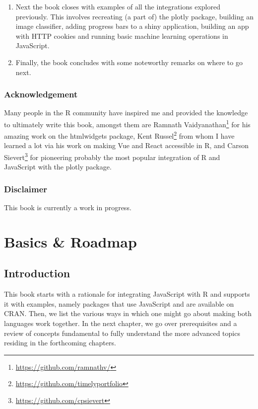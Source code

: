 \documentclass[
]{krantz}
\renewcommand{\href}[2]{#2\footnote{\url{#1}}}
\begin{document}
\begin{enumerate}
\item
  Next the book closes with examples of all the integrations explored previously. This involves recreating (a part of) the plotly package, building an image classifier, adding progress bars to a shiny application, building an app with HTTP cookies and running basic machine learning operations in JavaScript.
\item
  Finally, the book concludes with some noteworthy remarks on where to go next.
\end{enumerate}

\hypertarget{acknowledgement}{%
\section*{Acknowledgement}\label{acknowledgement}}


Many people in the R community have inspired me and provided the knowledge to ultimately write this book, amongst them are \href{https://github.com/ramnathv/}{Ramnath Vaidyanathan} for his amazing work on the htmlwidgets \citep{R-htmlwidgets} package, \href{https://github.com/timelyportfolio}{Kent Russel} from whom I have learned a lot via his work on making Vue and React accessible in R, and \href{https://github.com/cpsievert}{Carson Sievert} for pioneering probably the most popular integration of R and JavaScript with the plotly \citep{R-plotly} package.

\hypertarget{disclaimer}{%
\section*{Disclaimer}\label{disclaimer}}


This book is currently a work in progress.

\mainmatter

\hypertarget{part-basics-roadmap}{%
\part{Basics \& Roadmap}\label{part-basics-roadmap}}

\hypertarget{introduction}{%
\chapter{Introduction}\label{introduction}}

This book starts with a rationale for integrating JavaScript with R and supports it with examples, namely packages that use JavaScript and are available on CRAN. Then, we list the various ways in which one might go about making both languages work together. In the next chapter, we go over prerequisites and a review of concepts fundamental to fully understand the more advanced topics residing in the forthcoming chapters.
\end{document}
